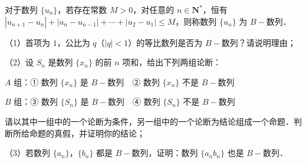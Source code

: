 \endgroup
\begin{question}
对于数列 $\{u_n\}$，若存在常数 $M>0$，对任意的 $n\in\mathbf N^*$，恒有 $|u_{n+1}-u_n|+|u_n-u_{n-1}|+\cdots+|u_2-u_1|\leqslant M$，则称数列 $\{u_n\}$ 为 $B-$数列．

（1）首项为 $1$，公比为 $q$（$|q|<1$）的等比数列是否为 $B-$数列？请说明理由；

（2）设 $S_n$ 是数列 $\{x_n\}$ 的前 $n$ 项和，给出下列两组论断：

$A$ 组：① 数列 $\{x_n\}$ 是 $B-$数列　② 数列 $\{x_n\}$ 不是 $B-$数列

$B$ 组：③ 数列 $\{S_n\}$ 是 $B-$数列　④ 数列 $\{S_n\}$ 不是 $B-$数列

请以其中一组中的一个论断为条件，另一组中的一个论断为结论组成一个命题．判断所给命题的真假，并证明你的结论；

（3）若数列 $\{a_n\}$，$\{b_n\}$ 都是 $B-$数列，证明：数列 $\{a_nb_n\}$ 也是 $B-$数列．

\end{question}